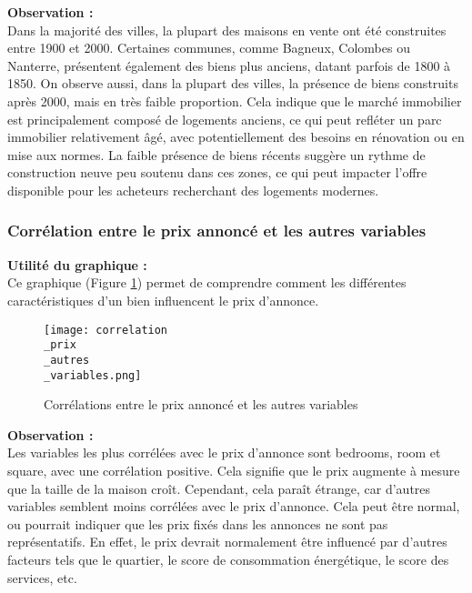 \documentclass[a4paper, 12pt, twoside]{report}
\begin{document}
			{\bf Observation :} \\

			Dans la majorité des villes, la plupart des maisons en vente ont été construites entre 1900 et 2000. Certaines communes, comme Bagneux, Colombes ou Nanterre, présentent également des biens plus anciens, datant parfois de 1800 à 1850. On observe aussi, dans la plupart des villes, la présence de biens construits après 2000, mais en très faible proportion. Cela indique que le marché immobilier est principalement composé de logements anciens, ce qui peut refléter un parc immobilier relativement âgé, avec potentiellement des besoins en rénovation ou en mise aux normes. La faible présence de biens récents suggère un rythme de construction neuve peu soutenu dans ces zones, ce qui peut impacter l’offre disponible pour les acheteurs recherchant des logements modernes.

			\subsubsection{Corrélation entre le prix annoncé et les autres variables}

			{\bf Utilité du graphique :} \\

			Ce graphique (Figure \ref{correlationPrixAutresVariables}) permet de comprendre comment les différentes caractéristiques d'un bien influencent le prix d'annonce. \\

			\begin{figure}[h]
				\centering
				\texttt{[image: correlation\\\_prix\\\_autres\\\_variables.png]}
				\caption{Corrélations entre le prix annoncé et les autres variables}
				\label{correlationPrixAutresVariables}
			\end{figure}

			{\bf Observation :} \\

			Les variables les plus corrélées avec le prix d'annonce sont bedrooms, room et square, avec une corrélation positive. Cela signifie que le prix augmente à mesure que la taille de la maison croît. Cependant, cela paraît étrange, car d'autres variables semblent moins corrélées avec le prix d'annonce. Cela peut être normal, ou pourrait indiquer que les prix fixés dans les annonces ne sont pas représentatifs. En effet, le prix devrait normalement être influencé par d'autres facteurs tels que le quartier, le score de consommation énergétique, le score des services, etc. \\
\end{document}
